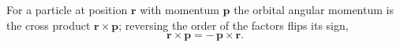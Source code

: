\documentclass{article}
\begin{document}
For a particle at position $\mathbf{r}$ with momentum $\mathbf{p}$ the orbital angular momentum is
the cross product $\mathbf{r}\times\mathbf{p}$; reversing the order of the factors flips its sign,
\begin{equation}
\mathbf{r}\times\mathbf{p} = -\,\mathbf{p}\times\mathbf{r} .
\label{eq:L}
\end{equation}
\end{document}
